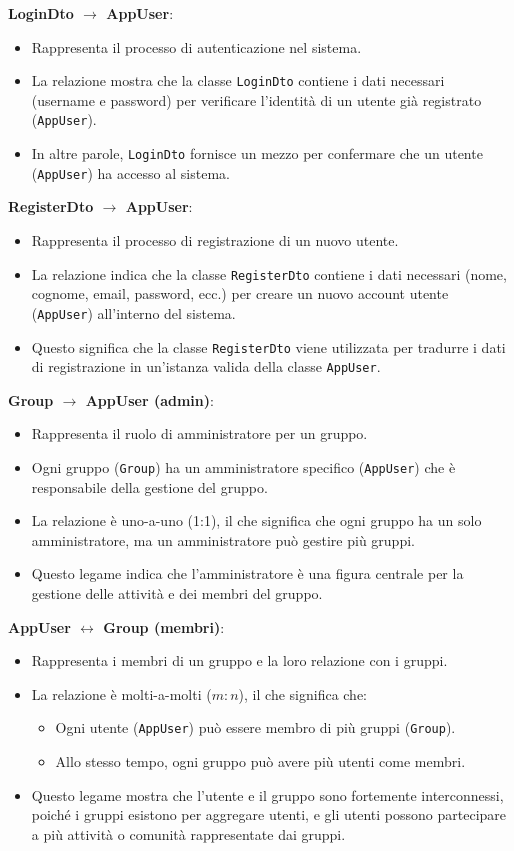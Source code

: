 \textbf{LoginDto $\rightarrow$ AppUser}:
\begin{itemize}
    \item Rappresenta il processo di autenticazione nel sistema.
    \item La relazione mostra che la classe \texttt{LoginDto} contiene i dati necessari (username e password) per verificare l'identità di un utente già registrato (\texttt{AppUser}).
    \item In altre parole, \texttt{LoginDto} fornisce un mezzo per confermare che un utente (\texttt{AppUser}) ha accesso al sistema.
\end{itemize}
\textbf{RegisterDto $\rightarrow$ AppUser}:
\begin{itemize}
    \item Rappresenta il processo di registrazione di un nuovo utente.
    \item La relazione indica che la classe \texttt{RegisterDto} contiene i dati necessari (nome, cognome, email, password, ecc.) per creare un nuovo account utente (\texttt{AppUser}) all'interno del sistema.
    \item Questo significa che la classe \texttt{RegisterDto} viene utilizzata per tradurre i dati di registrazione in un'istanza valida della classe \texttt{AppUser}.
\end{itemize}
\textbf{Group $\rightarrow$ AppUser (admin)}:
\begin{itemize}
    \item Rappresenta il ruolo di amministratore per un gruppo.
    \item Ogni gruppo (\texttt{Group}) ha un amministratore specifico (\texttt{AppUser}) che è responsabile della gestione del gruppo.
    \item La relazione è uno-a-uno (1:1), il che significa che ogni gruppo ha un solo amministratore, ma un amministratore può gestire più gruppi.
    \item Questo legame indica che l'amministratore è una figura centrale per la gestione delle attività e dei membri del gruppo.
\end{itemize}
\textbf{AppUser $\leftrightarrow$ Group (membri)}:
\begin{itemize}
    \item Rappresenta i membri di un gruppo e la loro relazione con i gruppi.
    \item La relazione è molti-a-molti ($m:n$), il che significa che:
    \begin{itemize}
        \item Ogni utente (\texttt{AppUser}) può essere membro di più gruppi (\texttt{Group}).
        \item Allo stesso tempo, ogni gruppo può avere più utenti come membri.
    \end{itemize}
    \item Questo legame mostra che l'utente e il gruppo sono fortemente interconnessi, poiché i gruppi esistono per aggregare utenti, e gli utenti possono partecipare a più attività o comunità rappresentate dai gruppi.
\end{itemize}


